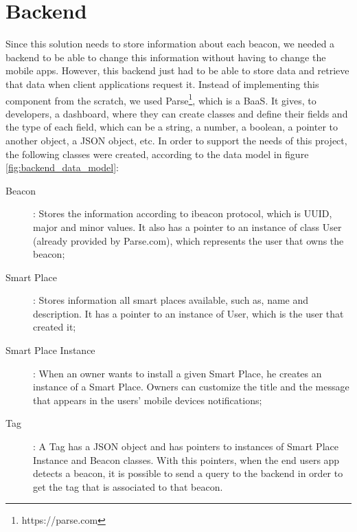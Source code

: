\section{Backend}
\label{sec:implementation_backend}
Since this solution needs to store information about each beacon, we
needed a backend to be able to change this information without having
to change the mobile apps.
However, this backend just had to be able to store data and retrieve that
data when client applications request it.
Instead of implementing this component from the scratch, we used
Parse\footnote{https://parse.com}, which is a \gls{BaaS}.
It gives, to developers, a dashboard, where they can create classes
and define their fields and the type of each field, which can be a string,
a number, a boolean, a pointer to another object, a \gls{JSON} object, etc.
In order to support the needs of this project, the following classes were
created, according to the data model in figure \ref{fig:backend_data_model}:
\begin{description}
  \item[Beacon]: Stores the information according to ibeacon protocol,
  which is \gls{UUID}, major and minor values. It also has a pointer
  to an instance of class User (already provided by Parse.com),
  which represents the user that owns the beacon;
  \item[Smart Place]: Stores information all smart places available,
  such as, name and description. It has a pointer to an instance of
  User, which is the user that created it;
  \item[Smart Place Instance]: When an owner wants to install a given
  Smart Place, he creates an instance of a Smart Place. Owners can
  customize the title and the message that appears in the users'
  mobile devices notifications;
  \item[Tag]: A Tag has a \gls{JSON} object and has pointers to instances
  of Smart Place Instance and Beacon classes. With this pointers, when
  the end users app detects a beacon, it is possible to send a query to
  the backend in order to get the tag that is associated to that beacon.
\end{description}

